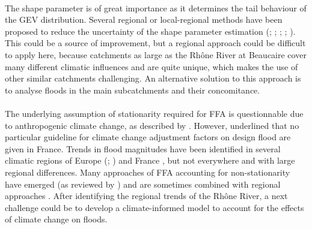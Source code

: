     \paragraph{}
    The shape parameter is of great importance as it determines the tail behaviour of the GEV distribution. Several regional or local-regional methods have been proposed to reduce the uncertainty of the shape parameter estimation (\citet{burn_evaluation_1990}; \citet{ouarda_regional_2001}; \citet{ribatet_regional_2007}; \citet{micevski_combining_2009}; \citet{haddad_regional_2012}). This could be a source of improvement, but a regional approach could be difficult to apply here, because catchments as large as the Rhône River at Beaucaire cover many different climatic influences and are quite unique, which makes the use of other similar catchments challenging. An alternative solution to this approach is to analyse floods in the main subcatchments and their concomitance.
    \paragraph{}The underlying assumption of stationarity required for FFA is questionnable due to anthropogenic climate change, as described by \citet{milly_stationarity_2008}. However, \citet{madsen_review_2014} underlined that no particular guideline for climate change adjustment factors on design flood are given in France. Trends in flood magnitudes have been identified in several climatic regions of Europe (\citet{hall_understanding_2014}; \citet{bloschl_changing_2019}) and France \citep{giuntoli_floods_2019}, but not everywhere and with large regional differences. Many approaches of FFA accounting for non-stationarity have emerged (as reviewed by \citet{salas_techniques_2018}) and are sometimes combined with regional approaches \citep{han_incorporating_2022}. After identifying the regional trends of the Rhône River, a next challenge could be to develop a climate-informed model to account for the effects of climate change on floods.
    
